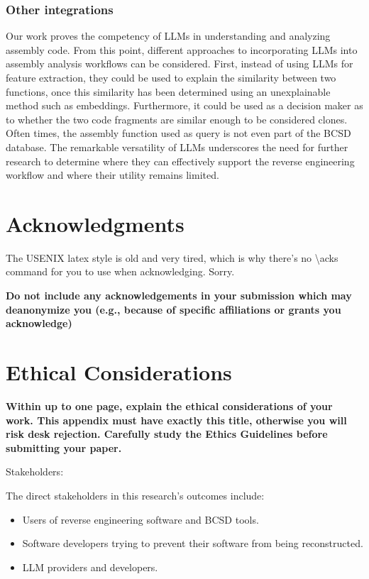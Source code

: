 \subsubsection{Other integrations}

Our work proves the competency of LLMs in understanding and analyzing assembly code. From this point, different approaches
to incorporating LLMs into assembly analysis workflows can be considered. First, instead of using LLMs for feature extraction,
they could be used to explain the similarity between two functions, once this similarity has been determined using an unexplainable
method such as embeddings. Furthermore, it could be used as a decision maker as to whether the two code fragments are similar enough
to be considered clones. Often times, the assembly function used as query is not even part of the BCSD database. The remarkable versatility
of LLMs underscores the need for further research to determine where they can effectively support the reverse engineering workflow and where
their utility remains limited.

\section*{Acknowledgments}

The USENIX latex style is old and very tired, which is why
there's no \textbackslash{}acks command for you to use when
acknowledging. Sorry.

\textbf{Do not include any acknowledgements in your submission which may deanonymize you (e.g., because of specific affiliations or grants you acknowledge)}

\cleardoublepage
\appendix
\section*{Ethical Considerations}
\textbf{Within up to one page, explain the ethical considerations of your work. This appendix must have exactly this title, otherwise you will risk desk rejection. Carefully study the Ethics Guidelines before submitting your paper.}

Stakeholders:

The direct stakeholders in this research's outcomes include:
\begin{itemize}
\item Users of reverse engineering software and BCSD tools.
\item Software developers trying to prevent their software from being reconstructed.
\item LLM providers and developers.
\end{itemize}

